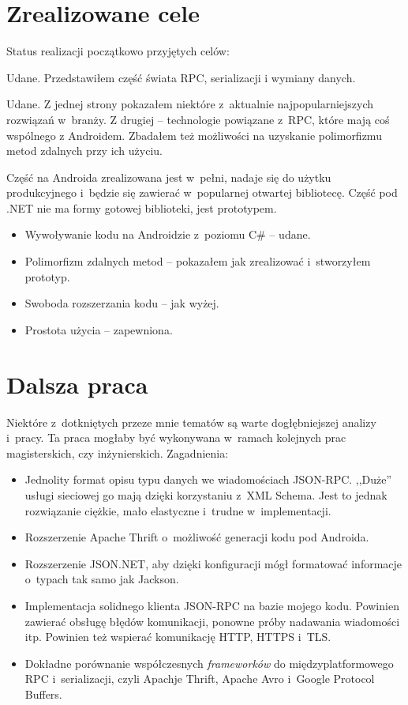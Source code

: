 \section{Zrealizowane cele}
Status realizacji początkowo przyjętych celów:
\begin{description}
Udane. Przedstawiłem część świata RPC, serializacji i wymiany danych.

Udane. Z jednej strony pokazałem niektóre z~aktualnie najpopularniejszych rozwiązań w~branży. Z drugiej -- technologie powiązane z~RPC, które mają coś wspólnego z Androidem.
Zbadałem też możliwości na uzyskanie polimorfizmu metod zdalnych przy ich użyciu.

Część na Androida zrealizowana jest w~pełni, nadaje się do użytku produkcyjnego i~będzie się zawierać w~popularnej otwartej bibliotecę.
Część pod .NET nie ma formy gotowej biblioteki, jest prototypem.
\begin{itemize}
  \item Wywoływanie kodu na Androidzie z~poziomu C\# -- udane.
	\item Polimorfizm zdalnych metod -- pokazałem jak zrealizować i~stworzyłem prototyp.
	\item Swoboda rozszerzania kodu -- jak wyżej.
	\item Prostota użycia -- zapewniona.
\end{itemize}

\end{description}



\section{Dalsza praca}
Niektóre z~dotkniętych przeze mnie tematów są warte dogłębniejszej analizy i~pracy.
Ta praca mogłaby być wykonywana w~ramach kolejnych prac magisterskich, czy inżynierskich.
Zagadnienia:
\begin{itemize}
	\item Jednolity format opisu typu danych we wiadomościach JSON-RPC. ,,Duże'' usługi sieciowej go mają dzięki korzystaniu z~XML Schema. Jest to jednak rozwiązanie ciężkie, mało elastyczne i~trudne w~implementacji.
	\item Rozszerzenie Apache Thrift o~możliwość generacji kodu pod Androida.
	\item Rozszerzenie JSON.NET, aby dzięki konfiguracji mógł formatować informacje o~typach tak samo jak Jackson.
	\item Implementacja solidnego klienta JSON-RPC na bazie mojego kodu. Powinien zawierać obsługę błędów komunikacji, ponowne próby nadawania wiadomości itp. Powinien też wspierać komunikację HTTP, HTTPS i~TLS.
	\item Dokładne porównanie współczesnych \emph{frameworków} do międzyplatformowego RPC i~serializacji, czyli Apachje Thrift, Apache Avro i~Google Protocol Buffers.
\end{itemize}


